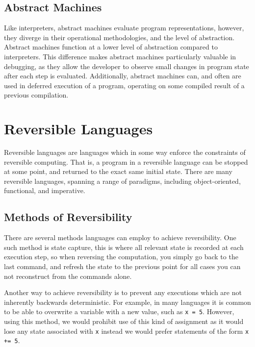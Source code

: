 \subsection{Abstract Machines}

Like interpreters, abstract machines evaluate program representations, however, they diverge in their operational methodologies, and the level of abstraction\cite{AbstractMachine, AbstractMachineForLanguage}. Abstract machines function at a lower level of abstraction compared to interpreters. This difference makes abstract machines particularly valuable in debugging, as they allow the developer to observe small changes in program state after each step is evaluated. Additionally, abstract machines can, and often are used in deferred execution of a program, operating on some compiled result of a previous compilation.

\section{Reversible Languages}

Reversible languages are languages which in some way enforce the constraints of reversible computing. That is, a program in a reversible language can be stopped at some point, and returned to the exact same initial state. There are many reversible languages, spanning a range of paradigms, including object-oriented, functional, and imperative\cite{Janus, RFun, ROOP}.

\subsection{Methods of Reversibility}

There are several methods languages can employ to achieve reversibility. One such method is state capture, this is where all relevant state is recorded at each execution step, so when reversing the computation, you simply go back to the last command, and refresh the state to the previous point for all cases you can not reconstruct from the commands alone.

Another way to achieve reversibility is to prevent any executions which are not inherently backwards deterministic. For example, in many languages it is common to be able to overwrite a variable with a new value, such as \lstinline{x = 5}. However, using this method, we would prohibit use of this kind of assignment as it would lose any state associated with \lstinline{x} instead we would prefer statements of the form \lstinline{x += 5}\cite{ReversibleTaxonomy}.

